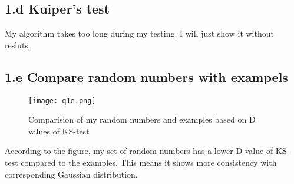 \subsection{1.d Kuiper's test}

My algorithm takes too long during my testing, I will just show it without resluts.

\subsection{1.e Compare random numbers with exampels}


\begin{figure}
  \centering
  \texttt{[image: q1e.png]}
  \caption{Comparision of my random numbers and examples based on D values of KS-test}
  \label{fig:comparision}
\end{figure}
According to the figure, my set of random numbers has a lower D value of KS-test compared to the examples.
This means it shows more consistency with corresponding Gaussian distribution.